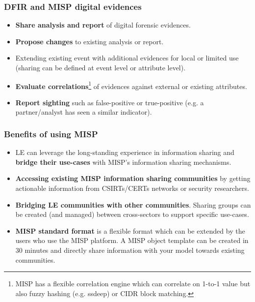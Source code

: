 \begin{frame}
\frametitle{DFIR and MISP digital evidences}
        \begin{itemize}
                \item {\bf Share analysis and report} of digital forensic evidences.
                \item {\bf Propose changes} to existing analysis or report.
                \item Extending existing event with additional evidences for local or limited use (sharing can be defined at event level or attribute level).
                \item {\bf Evaluate correlations}\footnote{MISP has a flexible correlation engine which can correlate on 1-to-1 value but also fuzzy hashing (e.g. ssdeep) or CIDR block matching.} of evidences against external or existing attributes.
                \item {\bf Report sighting} such as false-positive or true-positive (e.g. a partner/analyst has seen a similar indicator).
        \end{itemize}
\end{frame}

\begin{frame}
\frametitle{Benefits of using MISP}
\begin{itemize}
        \item  LE can leverage the long-standing experience in information sharing and {\bf bridge their use-cases} with MISP's information sharing mechanisms.
        \item {\bf Accessing existing MISP information sharing communities} by getting actionable information from CSIRTs/CERTs networks or security researchers.
        \item {\bf Bridging LE communities with other communities}. Sharing groups can be created (and managed) between cross-sectors to support specific use-cases.
        \item {\bf MISP standard format} is a flexible format which can be extended by the users who use the MISP platform. A MISP object template can be created in 30 minutes and directly share information with your model towards existing communities.
\end{itemize}
\end{frame}

